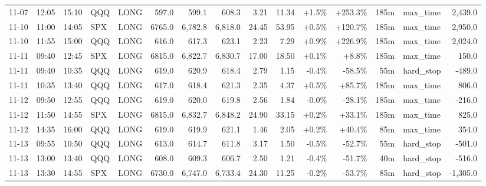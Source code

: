 \documentclass[11pt,a4paper,twoside]{article}
\begin{document}
\begin{landscape}
\begin{center}
\begin{longtable}{>{\color{txtmain}}l l l l l r r r r r r r r >{\color{txtmain}}l r}
11-07 & 12:05 & 15:10 & QQQ & LONG & 597.0 & 599.1 & 608.3 & 3.21 & 11.34 & \textcolor{wingreen}{+1.5\%} & \textcolor{wingreen}{+253.3\%} & 185m & max\_time & \textcolor{wingreen}{2,439.0} \\
11-10 & 11:00 & 14:05 & SPX & LONG & 6765.0 & 6,782.8 & 6,818.0 & 24.45 & 53.95 & \textcolor{wingreen}{+0.5\%} & \textcolor{wingreen}{+120.7\%} & 185m & max\_time & \textcolor{wingreen}{2,950.0} \\
11-10 & 11:55 & 15:00 & QQQ & LONG & 616.0 & 617.3 & 623.1 & 2.23 & 7.29 & \textcolor{wingreen}{+0.9\%} & \textcolor{wingreen}{+226.9\%} & 185m & max\_time & \textcolor{wingreen}{2,024.0} \\
11-11 & 09:40 & 12:45 & SPX & LONG & 6815.0 & 6,822.7 & 6,830.7 & 17.00 & 18.50 & \textcolor{wingreen}{+0.1\%} & \textcolor{wingreen}{+8.8\%} & 185m & max\_time & \textcolor{wingreen}{150.0} \\
11-11 & 09:40 & 10:35 & QQQ & LONG & 619.0 & 620.9 & 618.4 & 2.79 & 1.15 & \textcolor{lossred}{-0.4\%} & \textcolor{lossred}{-58.5\%} & 55m & hard\_stop & \textcolor{lossred}{-489.0} \\
11-11 & 10:35 & 13:40 & QQQ & LONG & 617.0 & 618.4 & 621.3 & 2.35 & 4.37 & \textcolor{wingreen}{+0.5\%} & \textcolor{wingreen}{+85.7\%} & 185m & max\_time & \textcolor{wingreen}{806.0} \\
11-12 & 09:50 & 12:55 & QQQ & LONG & 619.0 & 620.0 & 619.8 & 2.56 & 1.84 & \textcolor{lossred}{-0.0\%} & \textcolor{lossred}{-28.1\%} & 185m & max\_time & \textcolor{lossred}{-216.0} \\
11-12 & 11:50 & 14:55 & SPX & LONG & 6815.0 & 6,832.7 & 6,848.2 & 24.90 & 33.15 & \textcolor{wingreen}{+0.2\%} & \textcolor{wingreen}{+33.1\%} & 185m & max\_time & \textcolor{wingreen}{825.0} \\
11-12 & 14:35 & 16:00 & QQQ & LONG & 619.0 & 619.9 & 621.1 & 1.46 & 2.05 & \textcolor{wingreen}{+0.2\%} & \textcolor{wingreen}{+40.4\%} & 85m & max\_time & \textcolor{wingreen}{354.0} \\
11-13 & 09:55 & 10:50 & QQQ & LONG & 613.0 & 614.7 & 611.8 & 3.17 & 1.50 & \textcolor{lossred}{-0.5\%} & \textcolor{lossred}{-52.7\%} & 55m & hard\_stop & \textcolor{lossred}{-501.0} \\
11-13 & 13:00 & 13:40 & QQQ & LONG & 608.0 & 609.3 & 606.7 & 2.50 & 1.21 & \textcolor{lossred}{-0.4\%} & \textcolor{lossred}{-51.7\%} & 40m & hard\_stop & \textcolor{lossred}{-516.0} \\
11-13 & 13:30 & 14:55 & SPX & LONG & 6730.0 & 6,747.0 & 6,733.4 & 24.30 & 11.25 & \textcolor{lossred}{-0.2\%} & \textcolor{lossred}{-53.7\%} & 85m & hard\_stop & \textcolor{lossred}{-1,305.0} \\

\end{longtable}
\end{center}
\end{landscape}
\end{document}
